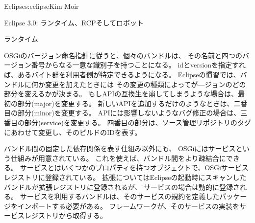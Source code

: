 \begin{aosachapter}{Eclipse}{s:eclipse}{Kim Moir}
\begin{aosasect1}{Eclipse 3.0: ランタイム、RCPそしてロボット}
\begin{aosasect2}{ランタイム}

OSGiのバージョン命名指針に従うと、個々のバンドルは、
その名前と四つのバージョン番号からなる一意な識別子を持つことになる。
idとversionを指定すれば、あるバイト群を利用者側が特定できるようになる。
Eclipseの慣習では、バンドルに何か変更を加えたときには
その変更の種類によってが—ジョンのどの部分を変えるかが決まる。
もしAPIの互換生を崩してしまうような場合は、最初の部分(major)を変更する。
新しいAPIを追加するだけのようなときは、二番目の部分(minor)を変更する。
APIには影響しないようなバグ修正の場合は、三番目の部分(service)を変更する。
四番目の部分は、ソース管理リポジトリのタグにあわせて変更し、そのビルドのIDを表す。

バンドル間の固定した依存関係を表す仕組み以外にも、
OSGiにはサービスという仕組みが用意されている。
これを使えば、バンドル間をより疎結合にできる。
サービスとはいくつかのプロパティを持つオブジェクトで、OSGiサービスレジストリに登録されている。
拡張についてはEclipseの起動時にスキャンしたバンドルが拡張レジストリに登録されるが、
サービスの場合は動的に登録される。
サービスを利用するバンドルは、そのサービスの規約を定義したパッケージをインポートする必要がある。
フレームワークが、そのサービスの実装をサービスレジストリから取得する。


\end{aosasect2}
\end{aosasect1}
\end{aosachapter}
